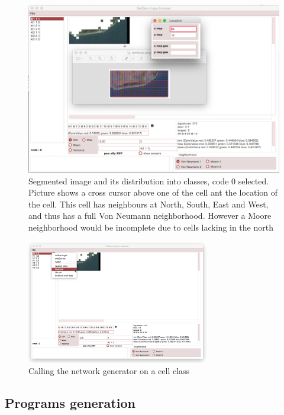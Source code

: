 \begin{figure}[hbtp]
\begin{center} 
\includegraphics[width=12cm]{classBrows+Loc+mask.png}
\caption{Segmented image and its distribution into classes, code 0 selected.
Picture shows a cross cursor above one of the cell ant the location of the cell.
This cell has neighbours at North, South, East and West, and thus has a full Von Neumann neighborhood.
However a Moore neighborhood would be incomplete due to cells lacking in the north}
\label{fig:classBrowser}
\end{center}
\end{figure}

\begin{figure}[hbtp]
\begin{center} 
\includegraphics[width=8cm]{generatingCellNetwork.png}
\caption{Calling the network generator on a cell class}
\label{fig:generatingCellNetwork}
\end{center}
\end{figure}
\subsection {Programs generation }

